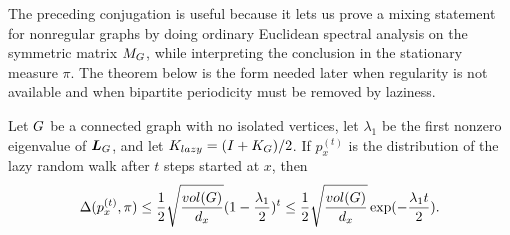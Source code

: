 The preceding conjugation is useful because it lets us prove a mixing statement for nonregular graphs by doing ordinary Euclidean spectral analysis on the symmetric matrix \(M_{G}\), while interpreting the conclusion in the stationary measure \(\pi\). The theorem below is the form needed later when regularity is not available and when bipartite periodicity must be removed by laziness.

\begin{theorem}
	\label{thm:lazy-walk-laplacian-mixing}
	Let \(G\) be a connected graph with no isolated vertices, let \(\lambda_1\) be the first nonzero eigenvalue of \(\boldsymbol{L}_{G}\), and let \(K_{lazy}=(I+K_{G})/2\). If \(p_x^{(t)}\) is the distribution of the lazy random walk after \(t\) steps started at \(x\), then
	\begin{equation}
		\Delta(p_x^{(t)},\pi)
		\leq
		\frac{1}{2}\sqrt{\frac{vol(G)}{d_x}}(1-\frac{\lambda_1}{2})^t
		\leq
		\frac{1}{2}\sqrt{\frac{vol(G)}{d_x}}\exp(-\frac{\lambda_1 t}{2}).
	\end{equation}
\end{theorem}

